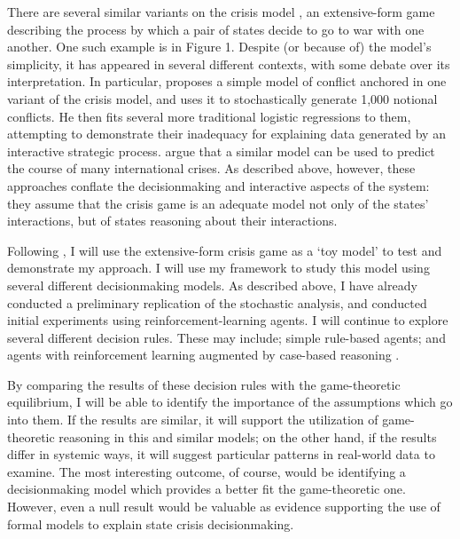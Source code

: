 There are several similar variants on the crisis model \citep{signorino_1999,carrubba_2007,bdm_1992}, an extensive-form game describing the process by which a pair of states decide to go to war with one another. One such example is in Figure 1. Despite (or because of) the model's simplicity, it has appeared in several different contexts, with some debate over its interpretation. In particular, \citet{signorino_1999} proposes a simple model of conflict anchored in one variant of the crisis model, and uses it to stochastically generate 1,000 notional conflicts. He then fits several more traditional logistic regressions to them, attempting to demonstrate their inadequacy for explaining data generated by an interactive strategic process. \citet{bdm_1992} argue that a similar model can be used to predict the course of many international crises. As described above, however, these approaches conflate the decisionmaking and interactive aspects of the system: they assume that the crisis game is an adequate model not only of the states' interactions, but of states reasoning about their interactions.


Following \citet{signorino_1999}, I will use the extensive-form crisis game as a `toy model' to test and demonstrate my approach. I will use my framework to study this model using several different decisionmaking models. As described above, I have already conducted a preliminary replication of the \citet{signorino_1999} stochastic analysis, and conducted initial experiments using reinforcement-learning agents. I will continue to explore several different decision rules. These may include; simple rule-based agents; and agents with reinforcement learning augmented by case-based reasoning \citep{izquierdo_2004}.

By comparing the results of these decision rules with the game-theoretic equilibrium, I will be able to identify the importance of the assumptions which go into them. If the results are similar, it will support the utilization of game-theoretic reasoning in this and similar models; on the other hand, if the results differ in systemic ways, it will suggest particular patterns in real-world data to examine. The most interesting outcome, of course, would be identifying a decisionmaking model which provides a better fit the game-theoretic one. However, even a null result would be valuable as evidence supporting the use of formal models to explain state crisis decisionmaking.

